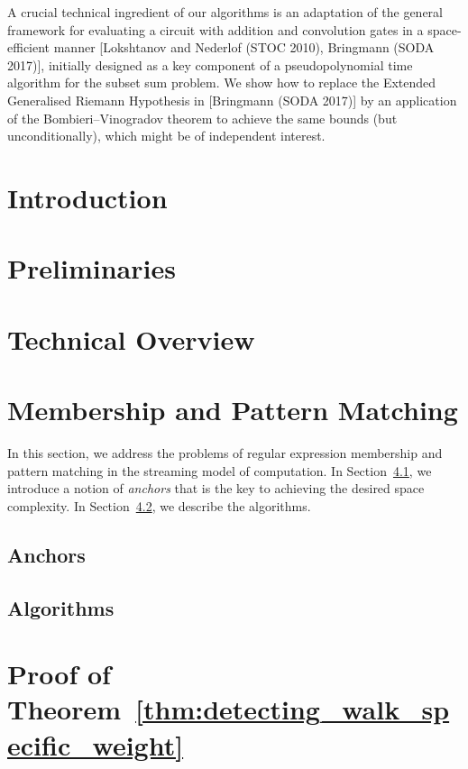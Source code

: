 \begin{small}
A crucial technical ingredient of our algorithms is an adaptation of the general framework for evaluating a circuit with addition and convolution gates in a space-efficient manner [Lokshtanov and Nederlof (STOC 2010), Bringmann (SODA 2017)], initially designed as a key component of a pseudopolynomial time algorithm for the subset sum problem. We show how to replace the Extended Generalised Riemann Hypothesis in [Bringmann (SODA 2017)] by an application of the Bombieri--Vinogradov theorem to achieve the same bounds (but unconditionally), which might be of independent interest.
\end{small}

\section{Introduction}
\label{regexp:sec:introduction}


\section{Preliminaries}
\label{regexp:sec:prelim}


\section{Technical Overview}
\label{regexp:sec:overview}


\section{Membership and Pattern Matching}\label{sec:regexp}
In this section, we address the problems of regular expression membership and pattern matching in the streaming model of computation. In Section~\ref{regexp:sec:anchors}, we introduce a notion of \emph{anchors} that is the key to achieving the desired space complexity. In Section~\ref{regexp:sec:algorithms}, we describe the algorithms.

\subsection{Anchors}
\label{regexp:sec:anchors}


\subsection{Algorithms}
\label{regexp:sec:algorithms}


\section{Proof of Theorem~\ref{thm:detecting_walk_specific_weight}}
\label{regexp:sec:paths-in-graph}

